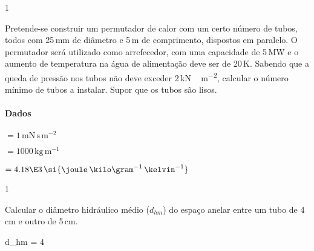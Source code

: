 \documentclass[\mainfilename]{subfiles}
\begin{document}
\begin{questionBox}1{} %
    
    Pretende-se construir um permutador de calor com um certo número de tubos, todos com 25\,\si{\milli\metre} de diâmetro e 5\,\si{\metre} de comprimento, dispostos em paralelo. O permutador será utilizado como arrefecedor, com uma capacidade de 5\,\si{\mega\watt} e o aumento de temperatura na água de alimentação deve ser de 20\,\si{\kelvin}. Sabendo que a queda de pressão nos tubos não deve exceder 2\,\si{\kilo\newton\,\metre^{-2}}, calcular o número mínimo de tubos a instalar. Supor que os tubos são lisos. 
    
    \paragraph*{Dados}
    \begin{description}
        \begin{multicols}{2}
            \item[\chemmu] \(=1\,\si{\milli\newton\,\second\,\metre^{-2}}\) 
            \item[\chemrho] \(=1000\,\si{\kilo\gram\,\metre^{-1}}\)
        \end{multicols}
        \item[\(C_{p}(\ch{H2O})\)] \(=4.18\E3\,\si{\joule\,\kilo\gram^{-1}\,\kelvin^{-1}}\)
    \end{description}
    
\end{questionBox}

\begin{questionBox}1{} %
    
    Calcular o diâmetro hidráulico médio (\(d_{hm}\)) do espaço anelar entre um tubo de 4\,\si{\centi\metre} e outro de 5\,\si{\centi\metre}.

    \begin{BM}
        d_{hm}
        = 4\,
    \end{BM}
    
\end{questionBox}
\end{document}
